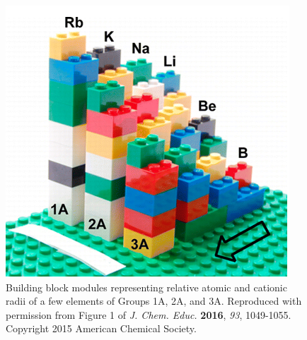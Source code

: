 \documentclass[11.5pt]{sig-alternate} %
\begin{document}
\begin{large}
\begin{figure}[h]
    \centering
    \includegraphics[width=1\linewidth]{fig3.png}
    \caption{Building block modules representing relative atomic and cationic radii of a few elements of Groups 1A, 2A, and 3A. Reproduced with permission from Figure 1 of \textit{J. Chem. Educ.} \textbf{2016}, \textit{93}, 1049-1055. Copyright 2015 American Chemical Society.}
\end{figure}


\end{large}
\end{document}
